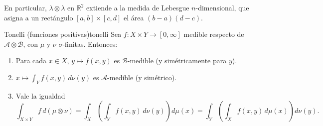 \documentclass[11pt, a4paper]{article}
\begin{document}
\obs En particular, $\lambda \otimes \lambda$ en $\mathbb{R}^2$ extiende a la medida de Lebesgue
$n$-dimensional, que asigna a un rectángulo $[a, b] \times [c, d]$ el área $(b-a)(d-c)$.

\begin{teorema}{Tonelli (funciones positivas)}{tonelli}
Sea $f: X \times Y \to [0, \infty]$ medible respecto de $\mathcal{A} \otimes \mathcal{B}$, con
$\mu$ y $\nu$ $\sigma$-finitas. Entonces:
\begin{enumerate}
    \item Para cada $x \in X$, $y \mapsto f(x, y)$ es $\mathcal{B}$-medible (y simétricamente
    para $y$).
    \item $x \mapsto \int_Y f(x, y) \, d\nu(y)$ es $\mathcal{A}$-medible (y simétrico).
    \item Vale la igualdad
    $$ \int_{X \times Y} f \, d(\mu \otimes \nu) = \int_X \!\left( \int_Y f(x, y) \, d\nu(y)
    \right) d\mu(x) = \int_Y \!\left( \int_X f(x, y) \, d\mu(x) \right) d\nu(y). $$
\end{enumerate}
\end{teorema}
\end{document}
